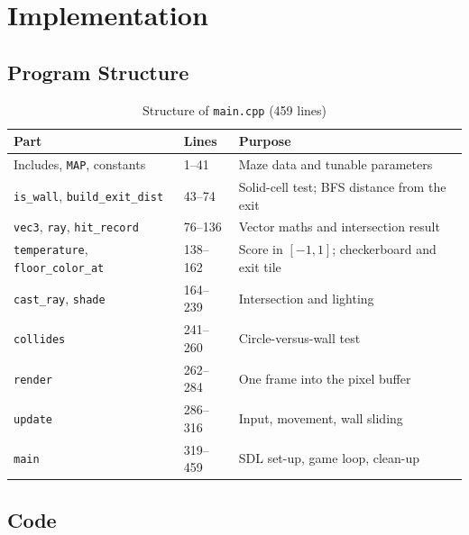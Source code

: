 \chapter{Implementation}

\section{Program Structure}

\begin{table}[H]
\centering
\caption{Structure of \texttt{main.cpp} (459 lines)}
\label{tab:funcs}
\small
\begin{tabular}{@{}p{4.4cm}p{1.8cm}p{8.2cm}@{}}
\toprule
\textbf{Part} & \textbf{Lines} & \textbf{Purpose} \\
\midrule
Includes, \texttt{MAP}, constants & 1--41 & Maze data and tunable parameters \\
\texttt{is\_wall}, \texttt{build\_exit\_dist} & 43--74 & Solid-cell test; BFS distance from the exit \\
\texttt{vec3}, \texttt{ray}, \texttt{hit\_record} & 76--136 & Vector maths and intersection result \\
\texttt{temperature}, \texttt{floor\_color\_at} & 138--162 & Score in $[-1,1]$; checkerboard and exit tile \\
\texttt{cast\_ray}, \texttt{shade} & 164--239 & Intersection and lighting \\
\texttt{collides} & 241--260 & Circle-versus-wall test \\
\texttt{render} & 262--284 & One frame into the pixel buffer \\
\texttt{update} & 286--316 & Input, movement, wall sliding \\
\texttt{main} & 319--459 & SDL set-up, game loop, clean-up \\
\bottomrule
\end{tabular}
\end{table}

\section{Code}





